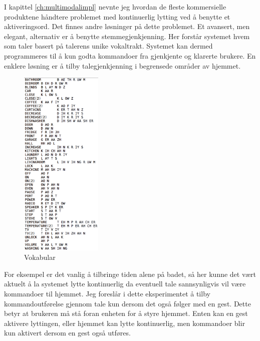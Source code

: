 I kapittel \ref{ch:multimodalimpl} nevnte jeg hvordan de fleste kommersielle produktene håndtere problemet med kontinuerlig lytting ved å benytte et aktiveringsord. Det finnes andre løsninger på dette problemet. Et avansert, men elegant, alternativ er å benytte stemmegjenkjenning. Her forstår systemet hvem som taler basert på talerens unike vokaltrakt. Systemet kan dermed programmeres til å kun godta kommandoer fra gjenkjente og klarerte brukere. En enklere løsning er å tilby talegjenkjenning i begrensede områder av hjemmet.
\begin{figure}
    \vspace{-20pt}
  \begin{center}
    \includegraphics[width=0.35\textwidth]{fig/dictionary}
  \end{center}
  \vspace{-20pt}
  \caption{Vokabular}
  \label{fig:vokabular}
  \vspace{-7pt}
\end{figure}
For eksempel er det vanlig å tilbringe tiden alene på badet, så her kunne det vært aktuelt å la systemet lytte kontinuerlig da eventuell tale sannsynligvis vil være kommandoer til hjemmet. Jeg foreslår i dette eksperimentet å tilby kommandoutførelse gjennom tale kun dersom det også følger med en gest. Dette betyr at brukeren må stå foran enheten for å styre hjemmet. Enten kan en gest aktivere lyttingen, eller hjemmet kan lytte kontinuerlig, men kommandoer blir kun aktivert dersom en gest også utføres.

